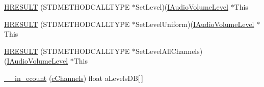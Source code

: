 \begin{DoxyCompactItemize}
\item 
\hyperlink{struct_i_audio_volume_level_vtbl_a74bfd65bdc90fd4a0e593d731293aacb}{H\+R\+E\+S\+U\+LT} (S\+T\+D\+M\+E\+T\+H\+O\+D\+C\+A\+L\+L\+T\+Y\+PE $\ast$Set\+Level)(\hyperlink{devicetopology_8h_acbf1b6a1081e8664f1fd024b6c9559b5}{I\+Audio\+Volume\+Level} $\ast$This
\item 
\hyperlink{struct_i_audio_volume_level_vtbl_a0994fcafa5ef7df116321fad924d488b}{H\+R\+E\+S\+U\+LT} (S\+T\+D\+M\+E\+T\+H\+O\+D\+C\+A\+L\+L\+T\+Y\+PE $\ast$Set\+Level\+Uniform)(\hyperlink{devicetopology_8h_acbf1b6a1081e8664f1fd024b6c9559b5}{I\+Audio\+Volume\+Level} $\ast$This
\item 
\hyperlink{struct_i_audio_volume_level_vtbl_a688d50bbb533d992e787b619c03197ef}{H\+R\+E\+S\+U\+LT} (S\+T\+D\+M\+E\+T\+H\+O\+D\+C\+A\+L\+L\+T\+Y\+PE $\ast$Set\+Level\+All\+Channels)(\hyperlink{devicetopology_8h_acbf1b6a1081e8664f1fd024b6c9559b5}{I\+Audio\+Volume\+Level} $\ast$This
\item 
\hyperlink{struct_i_audio_volume_level_vtbl_a706a61eb672cf2132ca4627494d0d24a}{\+\_\+\+\_\+in\+\_\+ecount} (\hyperlink{struct_i_audio_volume_level_vtbl_aa87037af17ec90fcd3ca9aa1839aa730}{c\+Channels}) float a\+Levels\+DB\mbox{[}$\,$\mbox{]}
\end{DoxyCompactItemize}
